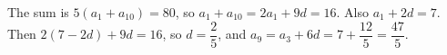 The sum is $5(a_1+a_{10})=80$, so $a_1+a_{10}=2a_1+9d=16$. Also $a_1+2d=7$. Then $2(7-2d)+9d=16$, so $d=\dfrac{2}{5}$, and $a_9=a_3+6d=7+\dfrac{12}{5}=\boxed{\dfrac{47}{5}}$.
